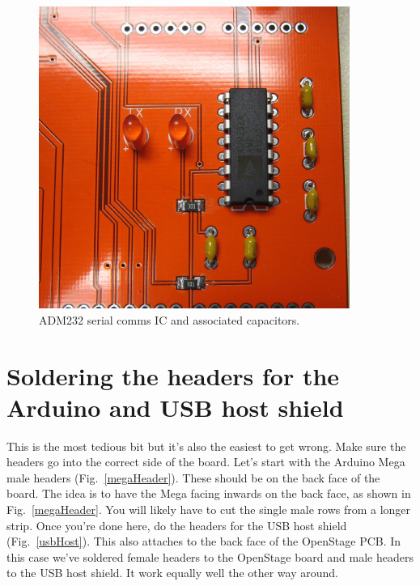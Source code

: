 \documentclass[11pt]{report} %
\begin{document}
\begin{figure}[!ht]
\centering
\includegraphics[width=4in]{IMG_3208.JPG}
\caption{ADM232 serial comms IC and associated capacitors.}
\label{ADM232}
\end{figure}

\clearpage

\section{Soldering the headers for the Arduino and USB host shield}
This is the most tedious bit but it's also the easiest to get wrong. Make sure the headers go into the correct side of the board. Let's start with the Arduino Mega male headers (Fig.~\ref{megaHeader}). These should be on the back face of the board. The idea is to have the Mega facing inwards on the back face, as shown in Fig.~\ref{megaHeader}. You will likely have to cut the single male rows from a longer strip. Once you're done here, do the headers for the USB host shield (Fig.~\ref{usbHost}). This also attaches to the back face of the OpenStage PCB. In this case we've soldered female headers to the OpenStage board and male headers to the USB host shield. It work equally well the other way around. 
\end{document}

